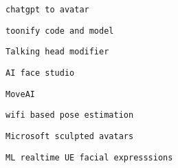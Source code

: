          
         
          \protect\hypertarget{ID_1840711453}{}{}

\begin{verbatim}
chatgpt to avatar
\end{verbatim}
         

         
         
          \protect\hypertarget{ID_547479116}{}{}

\begin{verbatim}
toonify code and model
\end{verbatim}
         

         
         
          \protect\hypertarget{ID_589161929}{}{}

\begin{verbatim}
Talking head modifier
\end{verbatim}
         

         
         
          \protect\hypertarget{ID_150520328}{}{}

\begin{verbatim}
AI face studio
\end{verbatim}
         

         
         
          \protect\hypertarget{ID_1300501383}{}{}

\begin{verbatim}
MoveAI
\end{verbatim}
         

         
         
          \protect\hypertarget{ID_45003651}{}{}

\begin{verbatim}
wifi based pose estimation
\end{verbatim}
         

         
         
          \protect\hypertarget{ID_616872142}{}{}

\begin{verbatim}
Microsoft sculpted avatars
\end{verbatim}
         

         
         
          \protect\hypertarget{ID_441327084}{}{}

\begin{verbatim}
ML realtime UE facial expresssions
\end{verbatim}
         

